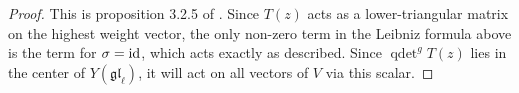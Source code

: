 \documentclass[11pt]{report}
\newtheorem{prop}[theorem]{Proposition}
\theoremstyle{definition}
\newtheorem{definition}[theorem]{Definition}
\theoremstyle{remark}
\theoremstyle{remark}
\newcommand{\id}{\textnormal{id}}
\newcommand{\C}{\mathbb{C}}
\begin{document}
\begin{proof}
This is proposition 3.2.5 of \cite{book:molev}. Since $T(z)$ acts as a lower-triangular matrix on the highest weight vector, the only non-zero term in the Leibniz formula above is the term for $\sigma = \id$, which acts exactly as described. Since $\operatorname{qdet}^g T(z)$ lies in the center of $Y(\mathfrak{gl}_\ell)$, it will act on all vectors of $V$ via this scalar.
\end{proof}

%
%
%
\end{document}
